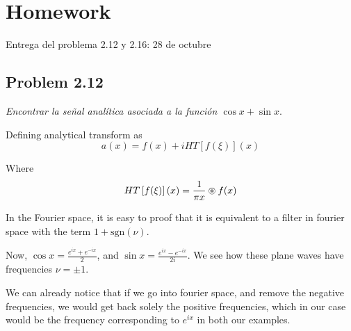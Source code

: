 \documentclass[../main/main.tex]{subfiles}
\begin{document}
\setcounter{chapter}{4}
\setcounter{section}{0}
\section{Homework}

Entrega del problema 2.12 y 2.16: 28 de octubre




\subsection*{Problem 2.12}
\emph{Encontrar la señal analítica asociada a la función $\cos x +\sin x$}.

Defining analytical transform as
\begin{equation}
	a(x) = f(x) + i HT\left[f(\xi)\right](x)
\end{equation}

Where
\begin{equation}
	HT\left[f(\xi)\right](x) = \frac{1}{\pi x} \circledast f(x)
\end{equation}

In the Fourier space, it is easy to proof that it is equivalent to a filter in fourier space with the term $1 + \textrm{sgn}(\nu)$.

Now, $\cos x = \frac{e^{i x} + e^{-ix}}{2}$, and
$\sin x = \frac{e^{i x} - e^{-ix}}{2 i}$. We see how these plane waves have frequencies $\nu=\pm 1$.

We can already notice that if we go into fourier space, and remove the negative frequencies, we would get back solely the positive frequencies, which in our case would be the frequency corresponding to $e^{ix}$ in both our examples.
\end{document}
